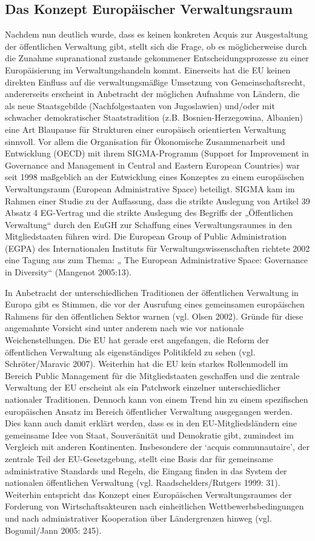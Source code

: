 \subsection{Das Konzept Europäischer Verwaltungsraum}
Nachdem nun deutlich wurde, dass es keinen konkreten Acquis zur Ausgestaltung der öffentlichen Verwaltung gibt, stellt sich die Frage, ob es möglicherweise durch die Zunahme supranational zustande gekommener Entscheidungsprozesse zu einer Europäisierung im Verwaltungshandeln kommt. Einerseits hat die EU keinen direkten Einfluss auf die verwaltungsmäßige Umsetzung von Gemeinschaftsrecht, andererseits erscheint in Anbetracht der möglichen Aufnahme von Ländern, die als neue Staatsgebilde (Nachfolgestaaten von Jugoslawien) und/oder mit schwacher demokratischer Staatstradition (z.B. Bosnien-Herzegowina, Albanien) eine Art Blaupause für Strukturen einer europäisch orientierten Verwaltung sinnvoll. Vor allem die Organisation für Ökonomische Zusammenarbeit und Entwicklung (OECD) mit ihrem SIGMA-Programm (Support for Improvement in Governance and Management in Central and Eastern European Countries) war seit 1998 maßgeblich an der Entwicklung eines Konzeptes zu einem europäischen Verwaltungsraum (European Administrative Space) beteiligt. SIGMA kam im Rahmen einer Studie zu der Auffassung, dass die strikte Auslegung von Artikel 39 Absatz 4 EG-Vertrag und die strikte Auslegung des Begriffs der „Öffentlichen Verwaltung“ durch den EuGH zur Schaffung eines Verwaltungsraumes in den Mitgliedstaaten führen wird. Die European Group of Public Administration (EGPA) des Internationalen Instituts für Verwaltungswissenschaften richtete 2002 eine Tagung aus zum Thema: „ The European Administrative Space: Governance in Diversity“ (Mangenot 2005:13).\par
In Anbetracht der unterschiedlichen Traditionen der öffentlichen Verwaltung in Europa gibt es Stimmen, die vor der Ausrufung eines gemeinsamen europäischen Rahmens für den öffentlichen Sektor warnen (vgl. Olsen 2002). Gründe für diese angemahnte Vorsicht sind unter anderem nach wie vor nationale Weichenstellungen. Die EU hat gerade erst angefangen, die Reform der öffentlichen Verwaltung als eigenständiges Politikfeld zu sehen (vgl. Schröter/Maravic 2007). Weiterhin hat die EU kein starkes Rollenmodell im Bereich Public Management für die Mitgliedstaaten geschaffen und die zentrale Verwaltung der EU erscheint als ein Patchwork einzelner unterschiedlicher nationaler Traditionen. Dennoch kann von einem Trend hin zu einem spezifischen europäischen Ansatz im Bereich öffentlicher Verwaltung ausgegangen werden. Dies kann auch damit erklärt werden, dass es in den EU-Mitgliedsländern eine gemeinsame Idee von Staat, Souveränität und Demokratie gibt, zumindest im Vergleich mit anderen Kontinenten. Insbesondere der ‘acquis communautaire’, der zentrale Teil der EU-Gesetzgebung, stellt eine Basis dar für gemeinsame administrative Standards und Regeln, die Eingang finden in das System der nationalen öffentlichen Verwaltung (vgl. Raadschelders/Rutgers 1999: 31). Weiterhin entspricht das Konzept eines Europäischen Verwaltungsraumes der Forderung von Wirtschaftsakteuren nach einheitlichen Wettbewerbsbedingungen und nach administrativer Kooperation über Ländergrenzen hinweg (vgl. Bogumil/Jann 2005: 245). \par
